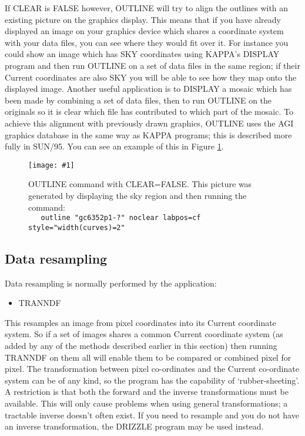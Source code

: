 \documentclass[twoside,11pt]{article}
\newcommand{\htmladdimg}[1]{}
\newcommand{\htmlref}[2]{#1}
\newcommand{\xref}[3]{#1}
\newcommand{\xlabel}[1]{}
\renewcommand{\_}{\texttt{\symbol{95}}}
\newcommand{\routine}[1]{{\sc #1}}
\newcommand{\xroutine}[1]{\htmlref{{\sc #1}}{#1}}
\newcommand{\myfig} [5] {
  \begin{figure}
    \centering\texttt{[image: \#1]}
    \typeout{#1 inserted on page \arabic{page}}
    \caption{\label{#4}#5}
  \end{figure}
  }
\newcommand{\myfig}[5]{
    \htmladdimg{#3}\\
    Figure: \label{#4} #5
    }
\begin{document}
If CLEAR is FALSE however, \routine{OUTLINE} will try to align the
outlines with an existing picture on the graphics display.
This means that if you have already displayed an image
on your graphics device which shares a coordinate system with
your data files, you can see where they would fit over it.
For instance you could show an image which has SKY coordinates
using KAPPA's \xref{DISPLAY}{sun95}{DISPLAY} program 
and then run \routine{OUTLINE} on a set of data files in the
same region; if their Current coordinates are also SKY 
you will be able to see how they map onto the displayed image.
Another useful application is to \routine{DISPLAY} 
a mosaic which has been made by combining a set of data files, 
then to run \routine{OUTLINE} on the originals 
so it is clear which file has contributed to which part of the mosaic.
To achieve this alignment with previously drawn graphics, 
\routine{OUTLINE} uses the AGI graphics database in 
the same way as KAPPA programs; 
this is described more fully in \xref{SUN/95}{sun95}{se_agitate}.
You can see an example of this in Figure \ref{OUTSKY}.

\myfig{sun139outsky.eps}{height=0.5\textheight}{outsky.gif}{OUTSKY}{OUTLINE
command with CLEAR=FALSE.  This picture was generated by displaying
the sky region and then running the command:\protect\\
{\tt\ \ \ outline "gc6352p1-?" noclear labpos=cf style="width(curves)=2"}}





\subsection{\xlabel{resampling}\label{resampling}Data resampling}

Data resampling is normally performed by the application:
\begin{itemize}
\item \xroutine{TRANNDF}
\end{itemize}
This resamples an image from pixel coordinates into
its Current coordinate system.
So if a set of images shares a common Current coordinate system
(as added by any of the methods described earlier in this section)
then running \routine{TRANNDF} on them all will enable them to
be compared or combined pixel for pixel.
The transformation between pixel co-ordinates and the Current
co-ordinate system can be of any kind,
so the program has the capability of `rubber-sheeting'.
A restriction is that both the forward and the inverse transformations
must be available. This will only cause problems when using general
transformations; a tractable inverse doesn't often exist.
If you need to resample and you do not have an inverse transformation, 
the \xroutine{DRIZZLE} program
may be used instead.
\end{document}
